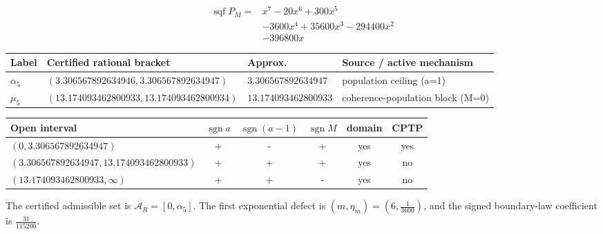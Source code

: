 \[\begin{aligned}
\operatorname{sqf}P_M={}&x^{7}-20 x^{6}+300 x^{5}\\
&-3600 x^{4}+35600 x^{3}-294400 x^{2}\\
&-396800 x
\end{aligned}\]
\begin{center}
\begin{tabularx}{\textwidth}{@{}l l l X@{}}
\toprule
Label & Certified rational bracket & Approx. & Source / active mechanism \\
\midrule
$\alpha_5$ & $(3.306567892634946,3.306567892634947)$ & $3.306567892634947$ & population ceiling (a=1) \\
$\mu_5$ & $(13.174093462800933,13.174093462800934)$ & $13.174093462800933$ & coherence-population block (M=0) \\
\bottomrule
\end{tabularx}
\end{center}
\begin{center}
\begin{tabular}{@{}l c c c c c@{}}
\toprule
Open interval & $\operatorname{sgn}a$ & $\operatorname{sgn}(a-1)$ & $\operatorname{sgn}M$ & domain & CPTP \\
\midrule
$(0,3.306567892634947)$ & + & - & + & yes & yes \\
$(3.306567892634947,13.174093462800933)$ & + & + & + & yes & no \\
$(13.174093462800933,\infty)$ & + & + & - & yes & no \\
\bottomrule
\end{tabular}
\end{center}
The certified admissible set is $\mathcal A_R=[0,\alpha_5]$. The first exponential defect is $(m,\eta_m)=(6,\frac{1}{3600})$, and the signed boundary-law coefficient is $\frac{31}{115200}$.
